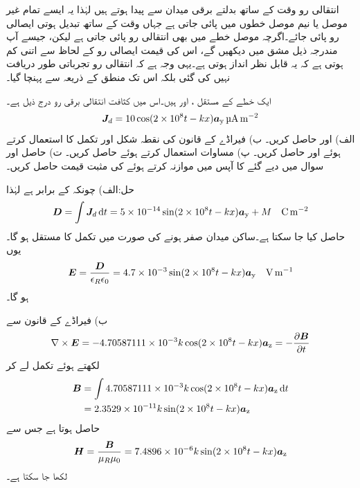انتقالی رو وقت کے ساتھ بدلتے برقی میدان سے پیدا ہوتے ہیں لہٰذا یہ ایسے تمام غیر موصل یا نیم موصل خطوں میں پائی جاتی ہے جہاں وقت کے ساتھ تبدیل ہوتی ایصالی رو پائی جائے۔اگرچہ موصل خطے میں بھی انتقالی رو پائی جاتی ہے لیکن، جیسے آپ مندرجہ ذیل مشق میں دیکھیں گے، اس کی قیمت ایصالی رو کے لحاظ  سے اتنی کم ہوتی ہے کہ یہ قابل نظر انداز ہوتی ہے۔یہی وجہ ہے کہ انتقالی رو تجرباتی طور دریافت نہیں کی گئی بلکہ اس تک منطق کے ذریعہ سے پہنچا گیا۔

ایک خطے کے مستقل ،  اور  ہیں۔اس میں کثافت انتقالی برقی رو درج ذیل ہے۔
\begin{align*}
{\ensuremath{{\boldsymbol{J}}}}_d=10\cos(2\times 10^8 t - k x) {\boldsymbol{a}}_{\textup{y}} \, \si{\micro\ampere\per\meter\squared}
\end{align*}
الف)  اور  حاصل کریں۔ ب) فیراڈے کے قانون کی نقطہ شکل اور تکمل کا استعمال کرتے ہوئے  اور  حاصل کریں۔ پ) مساوات  استعمال کرتے ہوئے  حاصل کریں۔ ت) حاصل  اور سوال میں دیے  گئے  کا آپس میں موازنہ کرتے ہوئے  کی مثبت قیمت حاصل کریں۔

حل:الف)  چونکہ  کے برابر ہے لہٰذا
\begin{align*}
\kvec{D}=\int \kvec{J}_d \dif t=5\times 10^{-14} \sin (2\times 10^8 t - k x) \ay +M \quad \si{\coulomb \per\meter\squared}
\end{align*}
حاصل کیا جا سکتا ہے۔ساکن میدان صفر ہونے کی صورت میں تکمل کا مستقل  ہو گا۔یوں
\begin{align*}
{\ensuremath{{\boldsymbol{E}}}}=\frac{{{\boldsymbol{D}}}}{\epsilon_R \epsilon_0}=4.7\times 10^{-3} \sin (2\times 10^8 t - k x) {\boldsymbol{a}}_{\textup{y}} \quad \si{\volt\per\meter}
\end{align*}
ہو گا۔

ب) فیراڈے کے قانون سے
\begin{align*}
\nabla \times {\ensuremath{{\boldsymbol{E}}}}=-4.70587111\times 10^{-3} k \cos (2\times 10^8 t - k x) {\boldsymbol{a}}_{\textup{z}}=-\frac{\partial {\ensuremath{{\boldsymbol{B}}}}}{\partial t}
\end{align*}
لکھتے ہوئے تکمل لے کر
\begin{align*}
\kvec{B}&=\int 4.70587111\times 10^{-3} k \cos (2\times 10^8 t - k x) \az \dif t \\
&=2.3529\times 10^{-11} k \sin(2\times 10^8 t - k x) \az
\end{align*}
حاصل ہوتا ہے جس سے
\begin{align*}
{\ensuremath{{\boldsymbol{H}}}}=\frac{{{\boldsymbol{B}}}}{\mu_R \mu_0}=7.4896\times 10^{-6} k \sin(2\times 10^8 t - k x) {\boldsymbol{a}}_{\textup{z}}
\end{align*}
لکھا جا سکتا ہے۔

